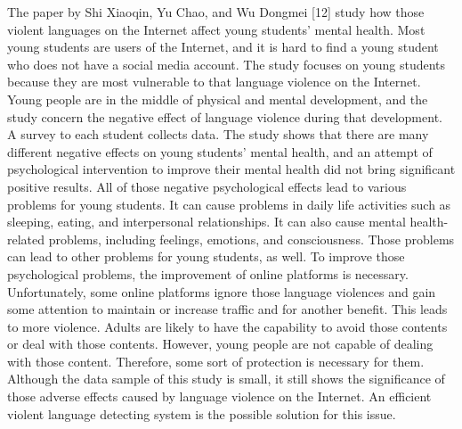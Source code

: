\documentclass[12pt, natbib=false]{article}
\begin{document}
The paper by Shi Xiaoqin, Yu Chao, and Wu Dongmei [12] study how those violent languages on the Internet affect young students' mental health. Most young students are users of the Internet, and it is hard to find a young student who does not have a social media account. The study focuses on young students because they are most vulnerable to that language violence on the Internet. Young people are in the middle of physical and mental development, and the study concern the negative effect of language violence during that development. A survey to each student collects data. The study shows that there are many different negative effects on young students’ mental health, and an attempt of psychological intervention to improve their mental health did not bring significant positive results. All of those negative psychological effects lead to various problems for young students. It can cause problems in daily life activities such as sleeping, eating, and interpersonal relationships. It can also cause mental health-related problems, including feelings, emotions, and consciousness. Those problems can lead to other problems for young students, as well. To improve those psychological problems, the improvement of online platforms is necessary. Unfortunately, some online platforms ignore those language violences and gain some attention to maintain or increase traffic and for another benefit. This leads to more violence. Adults are likely to have the capability to avoid those contents or deal with those contents. However, young people are not capable of dealing with those content. Therefore, some sort of protection is necessary for them. Although the data sample of this study is small, it still shows the significance of those adverse effects caused by language violence on the Internet. An efficient violent language detecting system is the possible solution for this issue. \\
\end{document}
